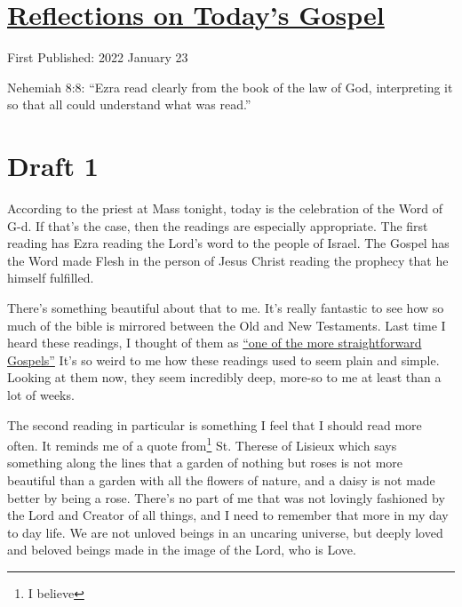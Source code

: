 \documentclass[12pt]{article}[titlepage]
\newcommand{\say}[1]{``#1''}
\newcommand{\1}{\={a}}
\newcommand{\2}{\={e}}
\newcommand{\3}{\={\i}}
\newcommand{\4}{\=o}
\newcommand{\5}{\=u}
\newcommand{\6}{\={A}}
\renewcommand{\,}{\textsuperscript{,}}
\begin{document}
\doublespacing
\section{\href{reflections-on-readings-3-ordinary-c-2022.html}{Reflections on Today's Gospel}}
First Published: 2022 January 23


Nehemiah 8:8: \say{Ezra read clearly from the book of the law of God, interpreting it so that all could understand what was read.}

\section{Draft 1}
According to the priest at Mass tonight, today is the celebration of the Word of G-d.
If that's the case, then the readings are especially appropriate.
The first reading has Ezra reading the Lord's word to the people of Israel.
The Gospel has the Word made Flesh in the person of Jesus Christ reading the prophecy that he himself fulfilled.

There's something beautiful about that to me.
It's really fantastic to see how so much of the bible is mirrored between the Old and New Testaments.
Last time I heard these readings, I thought of them as \href{reflections-on-readings-3-ordinary-c.html}{\say{one of the more straightforward Gospels}}
It's so weird to me how these readings used to seem plain and simple.
Looking at them now, they seem incredibly deep, more-so to me at least than a lot of weeks. 

The second reading in particular is something I feel that I should read more often.
It reminds me of a quote from\footnote{I believe} St. Therese of Lisieux which says something along the lines that a garden of nothing but roses is not more beautiful than a garden with all the flowers of nature, and a daisy is not made better by being a rose.
There's no part of me that was not lovingly fashioned by the Lord and Creator of all things, and I need to remember that more in my day to day life.
We are not unloved beings in an uncaring universe, but deeply loved and beloved beings made in the image of the Lord, who is Love.
\end{document}
